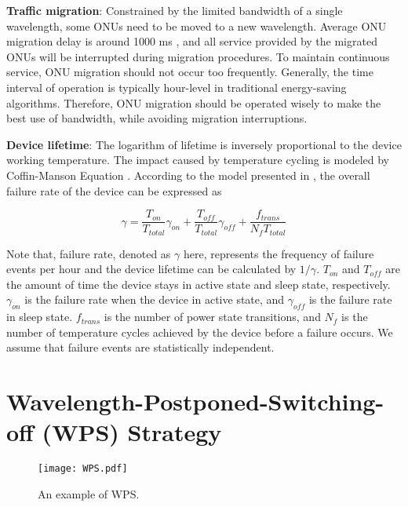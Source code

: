 \documentclass[letter]{IEEEtran}
\begin{document}
\textbf{Traffic migration}: Constrained by the limited bandwidth of a single wavelength, some ONUs need to be moved to a new wavelength. Average ONU migration delay is around 1000 ms \cite{Li:14}, and all service provided by the migrated ONUs will be interrupted during migration procedures. To maintain continuous service, ONU migration should not occur too frequently. Generally, the time interval of operation is typically hour-level in traditional energy-saving algorithms. Therefore, ONU migration should be operated wisely to make the best use of bandwidth, while avoiding migration interruptions.

\textbf{Device lifetime}: The logarithm of lifetime is inversely proportional to the device working temperature. The impact caused by temperature cycling is modeled by Coffin-Manson Equation \cite{manson1954behavior}. According to the model presented in \cite{7105670}, the overall failure rate of the device can be expressed as \\
\begin{footnotesize}
\begin{equation}
\gamma = \frac{T_{on}}{T_{total}}\gamma_{on} + \frac{T_{off}}{T_{total}}\gamma_{off} + \frac{f_{trans}}{N_{f}T_{total}}
\end{equation}
\end{footnotesize}
Note that, failure rate, denoted as $ \gamma $ here, represents the frequency of failure events per hour and the device lifetime can be calculated by $1 /\gamma$. $T_{on}$ and $T_{off}$ are the amount of time the device stays in active state and sleep state, respectively. $\gamma_{on}$ is the failure rate when the device in active state, and $\gamma_{off}$ is the failure rate in sleep state. $f_{trans}$ is the number of power state transitions, and $N_{f}$ is the number of temperature cycles achieved by the device before a failure occurs. We assume that failure events are statistically independent.
\vspace{-3.0mm}

\section{Wavelength-Postponed-Switching-off (WPS) Strategy}

\begin{figure}[t]
    \centering 
        \texttt{[image: WPS.pdf]}\\ 
    \caption{ An example of WPS.}
    \label{WPS}
    \vspace{-6.0mm}
\end{figure}
\end{document}
